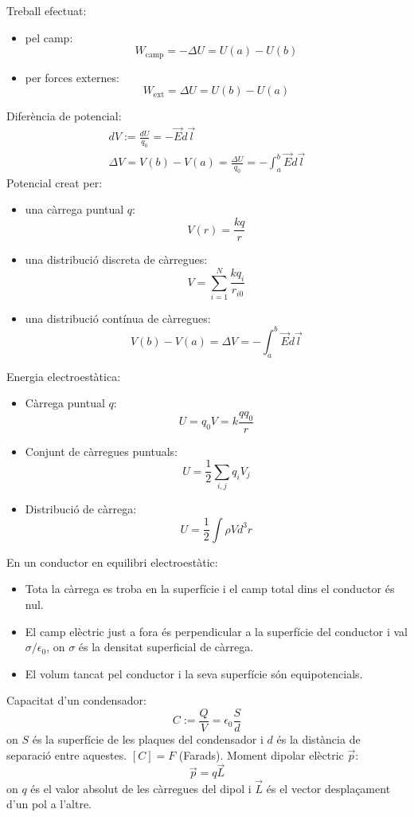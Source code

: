\documentclass[../../../main.tex]{subfiles}
\begin{document}
\begin{multicols}{2}
    Treball efectuat:
    \begin{itemize}
        \item pel camp: $$W_{\text{camp}}=-\Delta U=U(a)-U(b)$$
        \item per forces externes: $$W_{\text{ext}}=\Delta U=U(b)-U(a)$$
    \end{itemize}
    Diferència de potencial:
    \begin{gather*}
        dV:=\frac{dU}{q_0}=-\Vec{E}d\Vec{l}\\
        \Delta V=V(b)-V(a)=\frac{\Delta U}{q_0}=-\int_a^b\Vec{E}d\Vec{l}
    \end{gather*}
    Potencial creat per:
    \begin{itemize}
        \item una càrrega puntual $q$: $$V(r)=\frac{kq}{r}$$
        \item una distribució discreta de càrregues: $$V=\sum_{i=1}^N\frac{kq_i}{r_{i0}}$$
        \item una distribució contínua de càrregues:
              $$V(b)-V(a)=\Delta V=-\int_a^b\Vec{E}d\Vec{l}$$
    \end{itemize}
    Energia electroestàtica:
    \begin{itemize}
        \item Càrrega puntual $q$:$$U=q_0V=k\frac{qq_0}{r}$$
        \item Conjunt de càrregues puntuals: $$U=\frac{1}{2}\sum_{i,j}q_iV_j$$
        \item Distribució de càrrega:
              $$U=\frac{1}{2}\int\rho V d^3r$$
    \end{itemize}
    En un conductor en equilibri electroestàtic:
    \begin{itemize}
        \item Tota la càrrega es troba en la superfície i el camp total dins el conductor és nul.
        \item El camp elèctric just a fora és per\-pen\-di\-cu\-lar a la superfície del conductor i val $\sigma/\epsilon_0$, on $\sigma$ és la densitat superficial de càrrega.
        \item El volum tancat pel conductor i la seva superfície són equipotencials.
    \end{itemize}
    Capacitat d'un condensador: $$C:=\frac{Q}{V}=\epsilon_0\frac{S}{d}$$ {on $S$ és la superfície de les plaques del condensador i $d$ és la distància de separació entre aquestes. $[C]=F$ (Farads).}\newline
    Moment dipolar elèctric $\Vec{p}$: $$\Vec{p}=q\Vec{L}$$ {on $q$ és el valor absolut de les càrregues del dipol i $\Vec{L}$ és el vector desplaçament d'un pol a l'altre.}\newline

\end{multicols}
\end{document}
